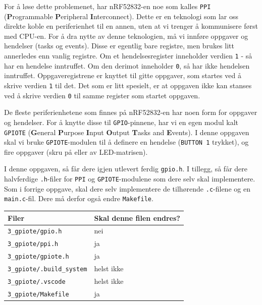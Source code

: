 For å løse dette problemenet, har nRF52832-en noe som kalles \verb|PPI| (\textbf{P}rogrammable \textbf{P}eripheral \textbf{I}nterconnect). Dette er en teknologi som lar oss direkte koble en periferienhet til en annen, uten at vi trenger å kommunisere først med CPU-en. For å dra nytte av denne teknologien, må vi innføre oppgaver og hendelser (tasks og events). Disse er egentlig bare registre, men brukes litt annerledes enn vanlig registre. Om et hendelsesregister inneholder verdien \verb|1| - så har en hendelse inntruffet. Om den derimot inneholder \verb|0|, så har ikke hendelsen inntruffet. Oppgaveregistrene er knyttet til gitte oppgaver, som startes ved å skrive verdien \verb|1| til det. Det som er litt spesielt, er at oppgaven ikke kan stanses ved å skrive verdien \verb|0| til samme register som startet oppgaven.

De fleste periferienhetene som finnes på nRF52832-en har noen form for oppgaver og hendelser. For å knytte disse til \verb|GPIO|-pinnene, har vi en egen modul kalt \verb|GPIOTE| (\textbf{G}eneral \textbf{P}urpose \textbf{I}nput \textbf{O}utput \textbf{T}asks and \textbf{E}vents). I denne oppgaven skal vi bruke \verb|GPIOTE|-modulen til å definere en hendelse (\verb|BUTTON 1| trykket), og fire oppgaver (skru på eller av LED-matrisen).


I denne oppgaven, så får dere igjen utlevert ferdig \verb|gpio.h|. I tillegg, så får dere halvferdige \verb|.h|-filer for \verb|PPI| og \verb|GPIOTE|-modulene som dere selv skal implementere. Som i forrige oppgave, skal dere selv implementere de tilhørende \verb|.c|-filene og en \verb|main.c|-fil. Dere må derfor også endre \verb|Makefile|.

\begin{center}
 \begin{tabular}{|p{8.5cm} p{5.5cm}|} 
 \hline
 Filer & Skal denne filen endres?  \\ [0.5ex] 
 \hline\hline
 \verb|3_gpiote/gpio.h| & \quad \quad \quad \quad nei  \\ 
 \hline
  \verb|3_gpiote/ppi.h| & \quad \quad \quad \quad ja  \\ 
  \hline
  \verb|3_gpiote/gpiote.h| & \quad \quad \quad \quad ja  \\ 
  \hline
  \verb|3_gpiote/.build_system| &  \quad \quad \quad \quad helst ikke \\ 
 \hline
 \verb|3_gpiote/.vscode| &  \quad \quad \quad \quad helst ikke \\ 
 \hline
 \verb|3_gpiote/Makefile| &  \quad \quad \quad \quad ja \\ 
 \hline
\end{tabular}
\end{center}




